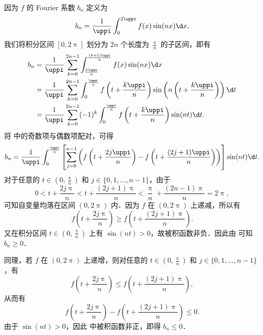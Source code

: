 \begin{myproof}

    因为 $f$ 的 Fourier 系数 $b_n$ 定义为
    \begin{equation}\label{eq:bn-def-3}
        b_n = \frac{1}{\uppi} \int_{0}^{2\uppi} f(x) \sin(nx) \d x,
    \end{equation}
    我们将积分区间 $[0, 2\uppi]$ 划分为 $2n$ 个长度为 $\frac{\uppi}{n}$ 的子区间，即有
    \begin{equation}\label{eq:bn-split-3}
        \begin{aligned}
            b_n & = \frac{1}{\uppi} \sum_{k=0}^{2n-1} \int_{\frac{k\uppi}{n}}^{\frac{(k+1)\uppi}{n}} f(x) \sin(nx) \d x                                                        \\
                & = \frac{1}{\uppi} \sum_{k=0}^{2n-1} \int_{0}^{\frac{\uppi}{n}} f\left( t + \frac{k\uppi}{n} \right) \sin\left(n\left(t + \frac{k\uppi}{n}\right)\right) \d t \\
                & = \frac{1}{\uppi} \sum_{k=0}^{2n-1} (-1)^k \int_{0}^{\frac{\uppi}{n}} f\left( t + \frac{k\uppi}{n} \right) \sin(nt) \d t.
        \end{aligned}
    \end{equation}
    将  中的奇数项与偶数项配对，可得
    \begin{equation}\label{eq:bn-paired-3}
        b_n = \frac{1}{\uppi} \int_{0}^{\frac{\uppi}{n}} \left[ \sum_{j=0}^{n-1} \left( f\left( t + \frac{2j\uppi}{n} \right) - f\left( t + \frac{(2j+1)\uppi}{n} \right) \right) \right] \sin(nt) \d t.
    \end{equation}
    对于任意的 $t \in \left(0, \frac{\uppi}{n}\right)$ 和 $j \in \{0, 1, \dots, n-1\}$，由于
    \begin{equation}\label{eq:interval-check-3}
        0 < t + \frac{2j\uppi}{n} < t + \frac{(2j+1)\uppi}{n} < \frac{\uppi}{n} + \frac{(2n-1)\uppi}{n} = 2\uppi,
    \end{equation}
    可知自变量均落在区间 $(0, 2\uppi)$ 内．因为 $f$ 在 $(0, 2\uppi)$ 上递减，所以有
    \begin{equation}
        f\left( t + \frac{2j\uppi}{n} \right) \geqslant f\left( t + \frac{(2j+1)\uppi}{n} \right).
    \end{equation}
    又在积分区间 $t \in \left(0, \frac{\uppi}{n}\right)$ 上有 $\sin(nt) > 0$，故被积函数非负．因此由  可知 $b_n \geqslant 0$．


    同理，若 $f$ 在 $(0, 2\uppi)$ 上递增，则对任意的 $t \in \left(0, \frac{\uppi}{n}\right)$ 和 $j \in \{0, 1, \dots, n-1\}$，有
    \begin{equation}
        f\left( t + \frac{2j\uppi}{n} \right) \leqslant f\left( t + \frac{(2j+1)\uppi}{n} \right),
    \end{equation}
    从而有
    \begin{equation}
        f\left( t + \frac{2j\uppi}{n} \right) - f\left( t + \frac{(2j+1)\uppi}{n} \right) \leqslant 0.
    \end{equation}
    由于 $\sin(nt) > 0$，因此  中被积函数非正，即得 $b_n \leqslant 0$．
\end{myproof}

